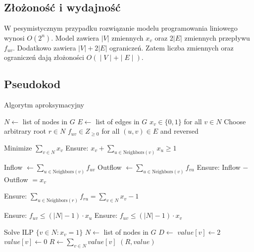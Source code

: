 \subsection{Złożoność i wydajność}

W pesymistycznym przypadku rozwiązanie modelu programowania liniowego wynosi $O(2^n)$. Model zawiera $|V|$ zmiennych $x_v$ oraz $2|E|$ zmiennych przepływu $f_{uv}$. Dodatkowo zawiera $|V| + 2|E|$ ograniczeń. Zatem liczba zmiennych oraz ograniczeń dają złożoności $O(∣V∣+∣E∣)$.

\subsection{Pseudokod}
\begin{algorithm}
    \caption*{Algorytm aproksymacyjny}
    \begin{algorithmic}[1]
        \State $N \gets$ list of nodes in $G$
        \State $E \gets$ list of edges in $G$
        \State $x_v \in \{0,1\}$ for all $v \in N$
        \State Choose arbitrary root $r \in N$
        \State $f_{uv} \in {Z}_{\geq 0}$ for all $(u,v) \in E$ and reversed
    
        \State Minimize $\sum_{v \in N} x_v$
            \State Ensure: $x_v + \sum_{u \in \text{Neighbors}(v)} x_u \geq 1$ 
        \EndFor
    
            \State Inflow $\gets \sum_{u \in \text{Neighbors}(v)} f_{uv}$
            \State Outflow $\gets \sum_{u \in \text{Neighbors}(v)} f_{vu}$
            \State Ensure: Inflow $-$ Outflow $= x_v$ 
        \EndFor
    
        \State Ensure: $\sum_{u \in \text{Neighbors}(r)} f_{ru} = \sum_{v \in N} x_v - 1$ 
    
            \State Ensure: $f_{uv} \leq (|N|-1) \cdot x_u$
            \State Ensure: $f_{uv} \leq (|N|-1) \cdot x_v$ 
        \EndFor
    
        \State Solve ILP
        \State \Return $\{v \in N : x_v = 1\}$
    \EndFunction
        \State $N \gets$ list of nodes in $G$
        \State $D \gets$ 
                \State $value[v] \gets 2$
            \Else
                \State $value[v] \gets 0$
            \EndIf
        \EndFor
        \State $R \gets \sum_{v \in N} value[v]$
        \State \Return $(R, value)$
    \EndFunction
    \end{algorithmic}
    \end{algorithm}

